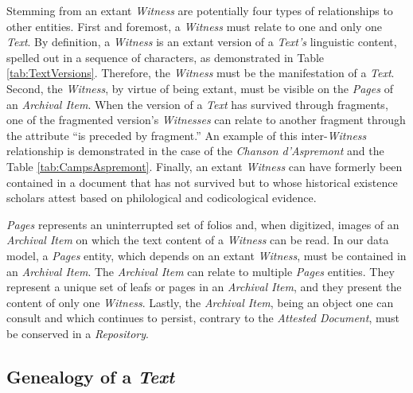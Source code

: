 Stemming from an extant \textit{Witness} are potentially four types of relationships to other entities. First and foremost, a \textit{Witness} must relate to one and only one \textit{Text}. By definition, a \textit{Witness} is an extant version of a \textit{Text's} linguistic content, spelled out in a sequence of characters, as demonstrated in Table \ref{tab:TextVersions}. Therefore, the \textit{Witness} must be the manifestation of a \textit{Text}. Second, the \textit{Witness}, by virtue of being extant, must be visible on the \textit{Pages} of an \textit{Archival Item}. When the version of a \textit{Text} has survived through fragments, one of the fragmented version's \textit{Witnesses} can relate to another fragment through the attribute ``is preceded by fragment.'' An example of this inter-\textit{Witness} relationship is demonstrated in the case of the \textit{Chanson d'Aspremont} and the Table \ref{tab:CampsAspremont}. Finally, an extant \textit{Witness} can have formerly been contained in a document that has not survived but to whose historical existence scholars attest based on philological and codicological evidence.

\textit{Pages} represents an uninterrupted set of folios 
and, when digitized, images of an \textit{Archival Item} on which the text content of a \textit{Witness} can be read. In our data model, a \textit{Pages} entity, which depends on an extant \textit{Witness}, must be contained in an \textit{Archival Item}. The \textit{Archival Item} can relate to multiple \textit{Pages} entities.
They represent a unique set of leafs or pages in an \textit{Archival Item}, and they present the content of only one \textit{Witness}. Lastly, the \textit{Archival Item}, being an object one can consult and which continues to persist, contrary to the \textit{Attested Document}, must be conserved in a \textit{Repository}.

\subsection{Genealogy of a \textit{Text}}
\label{sub:Graph}

